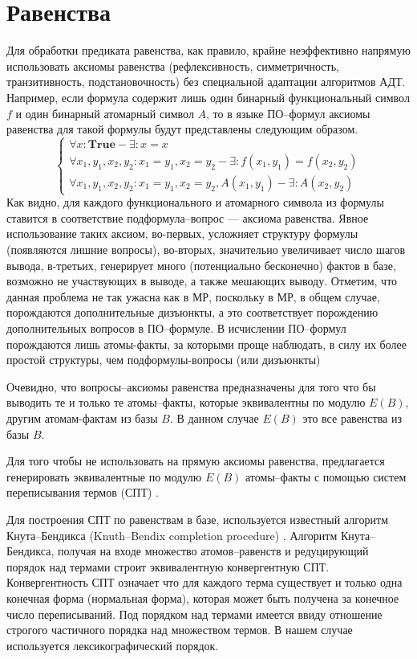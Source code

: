 \section{Равенства}
Для обработки предиката равенства, как правило, крайне неэффективно напрямую использовать аксиомы равенства (рефлексивность, симметричность, транзитивность, подстановочность) без специальной адаптации алгоритмов АДТ. Например, если формула содержит лишь один бинарный функциональный символ $f$ и один бинарный атомарный символ $A$, то в языке ПО--формул аксиомы равенства для такой формулы будут представлены следующим образом.
$$\left\lbrace
\begin{array}{l}
\forall x\colon\boldsymbol{True} - \exists\colon x = x \\
\forall x_1,y_1,x_2,y_2\colon x_1 = y_1, x_2 = y_2 - \exists\colon f(x_1,y_1) = f(x_2, y_2) \\
\forall x_1,y_1,x_2,y_2\colon x_1 = y_1, x_2 = y_2, A(x_1,y_1) - \exists\colon A(x_2,y_2)
\end{array}\right.
$$
Как видно, для каждого функционального и атомарного символа из формулы ставится в соответствие подформула--вопрос --- аксиома равенства. Явное использование таких аксиом, во-первых, усложняет структуру формулы (появляются лишние вопросы), во-вторых, значительно увеличивает число шагов вывода, в-третьих, генерирует много (потенциально бесконечно) фактов в базе, возможно не участвующих в выводе, а также мешающих выводу. Отметим, что данная проблема не так ужасна как в МР, поскольку в МР, в общем случае,  порождаются дополнительные дизъюнкты, а это соответствует порождению дополнительных вопросов в ПО--формуле. В исчислении ПО--формул порождаются лишь атомы-факты, за которыми проще наблюдать, в силу их более простой структуры, чем подформулы-вопросы (или дизъюнкты)

Очевидно, что вопросы--аксиомы равенства предназначены для того что бы выводить те и только те атомы--факты, которые эквивалентны по модулю $E(B)$, другим атомам-фактам из базы $B$. В данном случае $E(B)$ это все равенства из базы $B$.

Для того чтобы не использовать на прямую аксиомы равенства, предлагается генерировать эквивалентные по модулю $E(B)$ атомы--факты с помощью систем переписывания термов (СПТ) \cite{Nipkow}.

Для построения СПТ по равенствам в базе, используется известный алгоритм Кнута--Бендикса (Knuth--Bendix completion procedure) \cite{KBAlg}. Алгоритм Кнута--Бендикса, получая на входе множество атомов--равенств и редуцирующий порядок над термами \cite{Nipkow} строит эквивалентную конвергентную СПТ. Конвергентность СПТ означает что для каждого терма существует и только одна конечная форма (нормальная форма), которая может быть получена за конечное число переписываний. Под порядком над термами имеется ввиду отношение строгого частичного порядка над множеством термов. В нашем случае используется лексикографический порядок.

